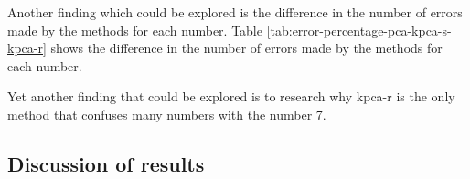 Another finding which could be explored is the difference in the number of errors made by the methods for each number. Table \ref{tab:error-percentage-pca-kpca-s-kpca-r} shows the difference in the number of errors made by the methods for each number.

Yet another finding that could be explored is to research why \gls{kpca-r} is the only method that confuses many numbers with the number 7.
\subsection{Discussion of results}

